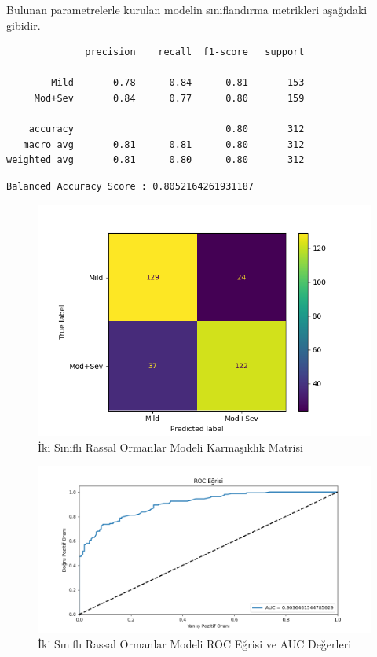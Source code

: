 \documentclass[12pt,twoside]{deuthesis}
\begin{document}
Bulunan parametrelerle kurulan modelin sınıflandırma metrikleri aşağıdaki gibidir.
\begin{verbatim}
              precision    recall  f1-score   support

        Mild       0.78      0.84      0.81       153
     Mod+Sev       0.84      0.77      0.80       159

    accuracy                           0.80       312
   macro avg       0.81      0.81      0.80       312
weighted avg       0.81      0.80      0.80       312
\end{verbatim}
\begin{verbatim}
Balanced Accuracy Score : 0.8052164261931187
\end{verbatim}
\begin{figure}

{\centering \includegraphics[width=1.05\linewidth,height=0.6\textheight]{figure/rf_bin_conf} 

}

\caption{İki Sınıflı Rassal Ormanlar Modeli Karmaşıklık Matrisi}\label{fig:unnamed-chunk-67}
\end{figure}
\begin{figure}

{\centering \includegraphics[width=1.05\linewidth,height=0.6\textheight]{figure/RandomForestClassifier_binary_roc} 

}

\caption{İki Sınıflı Rassal Ormanlar Modeli ROC Eğrisi ve AUC Değerleri}\label{fig:unnamed-chunk-68}
\end{figure}
\end{document}

